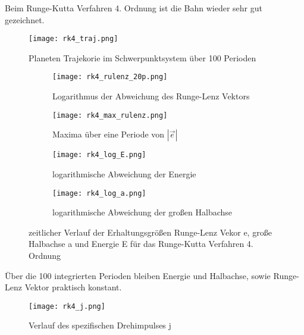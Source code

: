 \documentclass[12pt]{article}
\begin{document}
Beim Runge-Kutta Verfahren 4. Ordnung ist die Bahn wieder sehr gut gezeichnet.
\begin{figure}[H]\centering\texttt{[image: rk4\_traj.png]}\caption{Planeten Trajekorie im Schwerpunktsystem über 100 Perioden}\end{figure} 
\begin{figure}[H]
    \hspace*{-1.5cm}
    \begin{subfigure}{0.4\textwidth}
    \texttt{[image: rk4\_rulenz\_20p.png]}
    \caption{Logarithmus der Abweichung des Runge-Lenz Vektors}
    \end{subfigure}
    \hfill
    \begin{subfigure}{0.4\textwidth}
    \hspace*{-0.8cm}
    \texttt{[image: rk4\_max\_rulenz.png]}
    \caption{Maxima über eine Periode von $|\vec{e}|$}
    \end{subfigure}
    \hfill
    \hspace*{-1.5cm}
    \begin{subfigure}{0.4\textwidth}
    \texttt{[image: rk4\_log\_E.png]}
    \caption{logarithmische Abweichung der Energie}
    \end{subfigure}
    \hfill
    \begin{subfigure}{0.4\textwidth}
    \hspace*{-0.8cm}
    \texttt{[image: rk4\_log\_a.png]}
    \caption{logarithmische Abweichung der großen Halbachse}
    \end{subfigure}
    \hfill
    \caption{zeitlicher Verlauf der Erhaltungsgrößen Runge-Lenz Vekor e, große Halbachse a und Energie E für das Runge-Kutta Verfahren 4. Ordnung}\end{figure}
Über die 100 integrierten Perioden bleiben Energie und Halbachse, sowie Runge-Lenz Vektor praktisch konstant.
\begin{figure}[H]\centering\texttt{[image: rk4\_j.png]}\caption{Verlauf des spezifischen Drehimpulses j}\end{figure}
\end{document}
